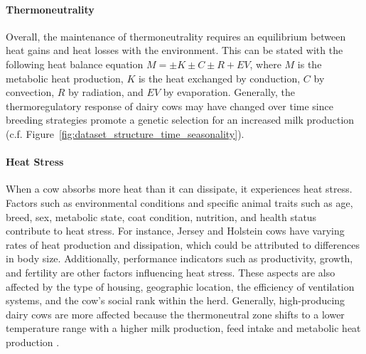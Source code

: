 \paragraph{Thermoneutrality}
Overall, the maintenance of thermoneutrality requires an equilibrium between heat gains and heat losses with the environment. This can be stated with the following heat balance equation $M = \pm K \pm C \pm R + EV$, where $M$ is the metabolic heat production, $K$ is the heat exchanged by conduction, $C$ by convection, $R$ by radiation, and $EV$ by evaporation. Generally, the thermoregulatory response of dairy cows may have changed over time since breeding strategies promote a genetic selection for an increased milk production (c.f. Figure~\ref{fig:dataset_structure_time_seasonality}).

\paragraph{Heat Stress}
When a cow absorbs more heat than it can dissipate, it experiences heat stress. Factors such as environmental conditions and specific animal traits such as age, breed, sex, metabolic state, coat condition, nutrition, and health status contribute to heat stress. For instance, Jersey and Holstein cows have varying rates of heat production and dissipation, which could be attributed to differences in body size. Additionally, performance indicators such as productivity, growth, and fertility are other factors influencing heat stress. These aspects are also affected by the type of housing, geographic location, the efficiency of ventilation systems, and the cow's social rank within the herd. Generally, high-producing dairy cows are more affected because the thermoneutral zone shifts to a lower temperature range with a higher milk production, feed intake and metabolic heat production \citep{gantner_differences_2017, tapki_comparison_2006}.

